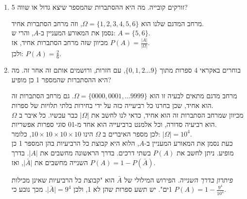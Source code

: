 \documentclass[12pt,a4paper]{article}
\begin{document}
\begin{enumerate}[label=\textcolor{BurntOrange}{שאלה \arabic*: }]
\item זורקים קובייה. מה היא ההסתברות שהמספר שיצא גדול או שווה 5? 
\begin{Solution}
מרחב המדגם שלנו הוא $\Omega = \{1,2,3,4,5,6\}$, וזה מרחב הסתברות אחיד. \\
נסמן את המאורע המעניין ב-$A$, והרי ש: $A=\{5,6\}$. \\
מכיוון שזה מרחב הסתברות אחיד, אז $P(A) = \frac{\lvert A \rvert}{\lvert \Omega \rvert}$. \\
ולכן: $P(A) = \frac{2}{6}$.
\end{Solution}
\item בוחרים באקראי 4 ספרות מתוך $\{0,1,2 \ldots 9 \}$, עם חזרות, ורושמים אותם זה אחר זה. מה היא ההסתברות שהמספר 1 כן מופיע?
\begin{Solution}
מרחב מדגם מתאים לבעיה זו הוא $\Omega=\{ 0000, 0001, \ldots 9999 \}$. גם מרחב הסתברות זה הוא אחיד, שכן בחרנו כל רביעייה כזה על ידי בחירות בלתי תלויות של ספרות. \\
מכיוון שמרחב הסתברות זה הוא אחיד, כדאי לנו לחשב את $\lvert \Omega \rvert$ כבר עכשיו. כל איבר ב $\Omega$ הוא רביעיה סדורה, וכל אלמנט ברביעייה הוא אחד מ-01 סוגי ספרות אפשריות. \\
לכן מספר האיברים ב $\Omega$ הינו $10 \times 10 \times 10 \times 10$, כלומר: $\lvert \Omega \rvert = 10^4$. \\
כעת נסמן את המאורע המעניין ב-$A$, הלוא היא קבוצת כל הרביעיות בהן המספר 1 כן מופיע. ניתן לחשב את $P(A)$ בשתי דרכים. בדרך הראשונה מחשבים את $\lvert A \rvert$. בדרך השנייה מחשבים את $\lvert \bar{A} \rvert$, ואז $P(A) = 1-P(\bar{A})$. 

\textit{פיתרון בדרך השנייה.} הפירוש המילולי של $\bar A$ הוא "קבוצת כל הרביעיות שאינן מכילות 1ים". יש תשע ספרות שהן לא 1, ולכן $\lvert \bar A \rvert = 9^4$. מכך נובע כי $P(A) = 1- \frac{9^4}{10^4}$.


\end{Solution}
\end{enumerate}
\end{document}
